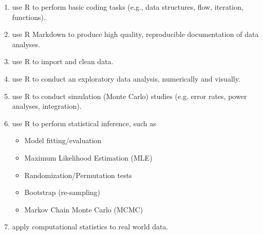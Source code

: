 \documentclass[11pt,onecolumn]{article}
\begin{document}
\begin{enumerate}
\item use R to perform basic coding tasks (e.g., data structures, flow, iteration, functions).
  \item use R Markdown to produce high quality, reproducible documentation of data analyses.
  \item use R to import and clean data.
  \item use R to conduct an exploratory data analysis, numerically and visually.
  \item use R to conduct simulation (Monte Carlo) studies (e.g. error rates, power analyses, integration).
  \item use R to perform statistical inference, such as
    \begin{itemize}
        \item Model fitting/evaluation
\item Maximum Likelihood Estimation (MLE)
\item Randomization/Permutation tests
\item Bootstrap (re-sampling)
\item Markov Chain Monte Carlo (MCMC)

\end{itemize}
    \item apply computational statistics to real world data.
\end{enumerate}
\end{document}
